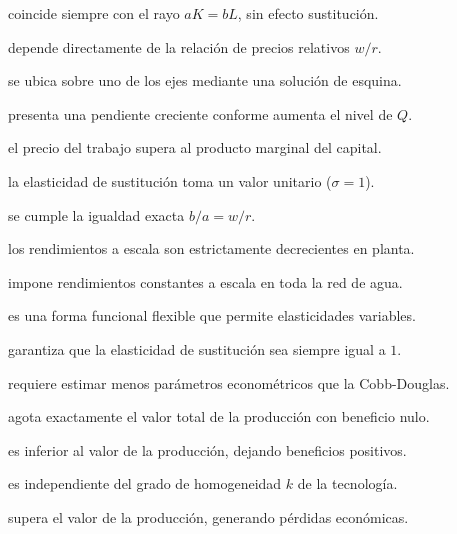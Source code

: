 \begin{opts}
    \item coincide siempre con el rayo $aK = bL$, sin efecto sustitución.
    \item depende directamente de la relación de precios relativos $w/r$.
    \item se ubica sobre uno de los ejes mediante una solución de esquina.
    \item presenta una pendiente creciente conforme aumenta el nivel de $Q$.
\end{opts}

\begin{opts}
    \item el precio del trabajo supera al producto marginal del capital.
    \item la elasticidad de sustitución toma un valor unitario ($\sigma = 1$).
    \item se cumple la igualdad exacta $b/a = w/r$.
    \item los rendimientos a escala son estrictamente decrecientes en planta.
\end{opts}

\begin{opts}
    \item impone rendimientos constantes a escala en toda la red de agua.
    \item es una forma funcional flexible que permite elasticidades variables.
    \item garantiza que la elasticidad de sustitución sea siempre igual a $1$.
    \item requiere estimar menos parámetros econométricos que la Cobb-Douglas.
\end{opts}

\begin{opts}
    \item agota exactamente el valor total de la producción con beneficio nulo.
    \item es inferior al valor de la producción, dejando beneficios positivos.
    \item es independiente del grado de homogeneidad $k$ de la tecnología.
    \item supera el valor de la producción, generando pérdidas económicas.
\end{opts}

